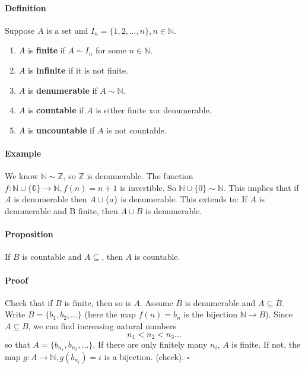 \documentclass{article}
\newcommand{\mapAb}[2]{\mathbb{#1}\xrightarrow{}{#2}}
\newcommand{\mapaB}[2]{{#1}\xrightarrow{}\mathbb{#2}}
\newcommand{\mapAB}[2]{\mathbb{#1}\xrightarrow{}\mathbb{#2}}
\begin{document}
	\paragraph{Definition}
	Suppose $A$ is a set and $I_n=\{1,2,\dots,n\}, n\in \mathbb{N}$.
	\begin{enumerate}[label=(\roman*)]
		\item $A$ is \textbf{finite} if $A\sim I_n$ for some $n\in \mathbb{N}$.\\
		\item $A$ is \textbf{infinite} if it is not finite.\\
		\item $A$ is \textbf{denumerable} if $A\sim\mathbb{N}$.\\
		\item $A$ is \textbf{countable} if $A$ is either finite xor denumerable.\\
		\item $A$ is \textbf{uncountable} if $A$ is not countable.
	\end{enumerate}
	\paragraph{Example} We know $\mathbb{N}\sim\mathbb{Z}$, so $\mathbb{Z}$ is denumerable.\newline
	The function $f:\mapAB{N\cup\{0\}}{N}, f(n)=n+1$ is invertible. So $\mathbb{N}\cup\{0\}\sim\mathbb{N}$.\newline
	This implies that if $A$ is denumerable then $A\cup\{a\}$ is denumerable.\newline
	This extends to: If $A$ is denumerable and B finite, then $A\cup B$ is denumerable.
	\paragraph{Proposition}If $B$ is countable and $A\subseteq$, then $A$ is countable.
	\paragraph{Proof} Check that if $B$ is finite, then so is $A$.\newline
	Assume $B$ is denumerable and $A\subseteq B$.\newline
	Write $B=\{b_1,b_2,\dots \}$ (here the map $f(n)=b_n$ is the bijection $\mapAb{N}{B}$).\newline
	Since $A\subseteq B$, we can find increasing natural numbers \[n_1<n_2<n_3\dots\] so that $A=\{b_{n_1},b_{n_2},\dots\}$.\newline
	If there are only finitely many $n_i$, $A$ is finite.\newline
	If not, the map $g:\mapaB{A}{N},g(b_{n_i})=i$ is a bijection. (check). $\square$
\end{document}
